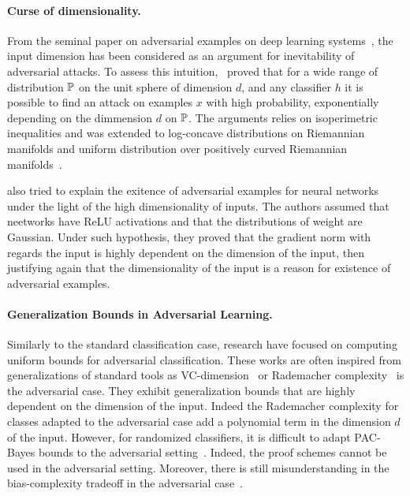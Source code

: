 \paragraph{Curse of dimensionality.} From the seminal paper on adversarial examples on deep learning systems~\citep{szegedy2014intriguing}, the input dimension has been considered as an argument for inevitability of adversarial attacks. To assess this intuition,~\citet{goodfelleshafahi2018adversarial} proved that for a wide range of distribution $\mathbb{P}$ on the unit sphere of dimension $d$, and any classifier $h$ it is possible to find an attack on examples $x$ with high probability, exponentially depending on the dimmension $d$ on $\mathbb{P}$. The arguments relies on isoperimetric inequalities and was extended to log-concave distributions on Riemannian manifolds and uniform distribution over positively curved Riemannian manifolds~\citep{pmlr-v97-dohmatob19a}. 

\citep{simon2019first} also tried to explain the exitence of adversarial examples for neural networks under the light of the high dimensionality of inputs. The authors assumed that neetworks have ReLU activations and that the distributions of weight are Gaussian. Under such hypothesis, they proved that the gradient norm with regards the input is highly dependent on the dimension of the input, then justifying again that the dimensionality of the input is a reason for existence of adversarial examples. 




\paragraph{Generalization Bounds in Adversarial Learning.} Similarly to the standard classification case, research have focused on computing uniform bounds for adversarial classification. These works are often inspired from generalizations of standard tools as VC-dimension~\citep{cullina2018pac} or Rademacher complexity~\citep{yin2019rademacher,khim2018adversarial,awasthi2020adversarial} is the adversarial case. They exhibit generalization bounds that are highly dependent on the dimension of the input. Indeed the Rademacher complexity for classes adapted to the adversarial case add a polynomial term in the dimension $d$ of the input. However, for randomized classifiers, it is difficult to adapt PAC-Bayes bounds to the adversarial setting~\citep{cxx}. Indeed, the proof schemes cannot be used in the adversarial setting. Moreover, there is still misunderstanding in the bias-complexity tradeoff in the adversarial case~\citep{xxx}. 

